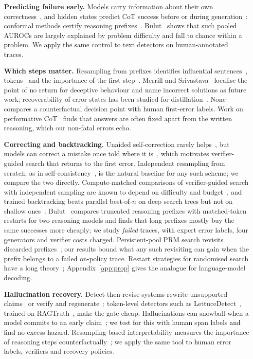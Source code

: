 \documentclass[10pt,twocolumn]{article}
\begin{document}
\textbf{Predicting failure early.} Models carry information about their own correctness~\cite{kadavath2022,orgad2024},
and hidden states predict CoT success before or during generation~\cite{afzal2025,lugoloobi2026};
conformal methods certify reasoning prefixes~\cite{cheung2026crop}.
Bulut~\cite{bulut2026} shows that such pooled AUROCs are largely explained by problem difficulty and
fall to chance within a problem. We apply the same control to text detectors on human-annotated traces.

\textbf{Which steps matter.} Resampling from prefixes identifies influential sentences~\cite{bogdan2025},
tokens~\cite{lin2025critical,bigelow2025} and the importance of the first step~\cite{liao2025lost}.
Merrill and Srivastava~\cite{merrill2026} localise the point of no return for deceptive behaviour and
name incorrect solutions as future work; recoverability of error states has been studied for
distillation~\cite{jiang2026ocr}. None compares a counterfactual decision point with human first-error
labels. Work on performative CoT~\cite{li2026performative,boppana2026} finds that answers are often
fixed apart from the written reasoning, which our non-fatal errors echo.

\textbf{Correcting and backtracking.} Unaided self-correction rarely helps~\cite{huang2024}, but
models can correct a mistake once told where it is~\cite{tyen2024}, which motivates verifier-guided
search that returns to the first error. Independent resampling from scratch, as in
self-consistency~\cite{wang2023sc}, is the natural baseline for any such scheme; we compare the two
directly. Compute-matched comparisons of verifier-guided search with independent sampling are
known to depend on difficulty and budget~\cite{snell2024}, and trained backtracking beats parallel
best-of-$n$ on deep search trees but not on shallow ones~\cite{qin2025backtrack}. Bulut~\cite{bulut2026} compares
truncated reasoning prefixes with matched-token restarts for two reasoning models and finds that
long prefixes mostly buy the same successes more cheaply; we study \emph{failed} traces, with
expert error labels, four generators and verifier costs charged. Persistent-pool PRM search revisits
discarded prefixes~\cite{tran2026sps}; our results bound what any such revisiting can gain when the
prefix belongs to a failed on-policy trace. Restart strategies for randomised search have a long
theory~\cite{luby1993,gomes2000}; Appendix~\ref{app:prop} gives the analogue for language-model
decoding.

\textbf{Hallucination recovery.} Detect-then-revise systems rewrite unsupported claims~\cite{gao2023rarr}
or verify and regenerate~\cite{dhuliawala2024cove}; token-level detectors such as
LettuceDetect~\cite{lettucedetect}, trained on RAGTruth~\cite{ragtruth}, make the gate cheap.
Hallucinations can snowball when a model commits to an early claim~\cite{zhang2024snowball}; we
test for this with human span labels and find no excess hazard. Resampling-based interpretability
measures the importance of reasoning steps counterfactually~\cite{bogdan2025,macar2025branches};
we apply the same tool to human error labels, verifiers and recovery policies.
\end{document}
